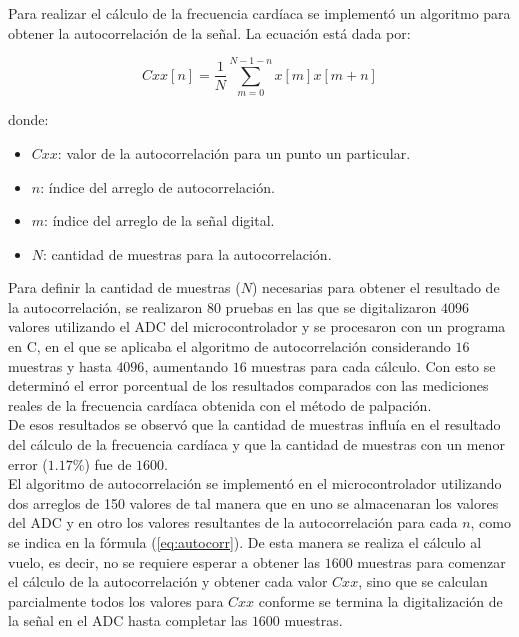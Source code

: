 \documentclass[journal]{IEEEtran}
\begin{document}
Para realizar el cálculo de la frecuencia cardíaca se implementó un algoritmo para obtener la autocorrelación de la señal. La ecuación está dada por:

\begin{equation}
	\label{eq:autocorr}
	Cxx[n] = \frac{1}{N} \sum_{m=0}^{N-1-n}x[m]x[m+n]
\end{equation}

donde: 
\begin{itemize}
	\item $Cxx$: valor de la autocorrelación para un punto un particular.
	\item $n$: índice del arreglo de autocorrelación.
	\item $m$: índice del arreglo de la señal digital.
	\item $N$: cantidad de muestras para la autocorrelación.\\
\end{itemize}

Para definir la cantidad de muestras ($N$) necesarias para obtener el resultado de la autocorrelación, se realizaron 80 pruebas en las que se digitalizaron $4096$ valores utilizando el ADC del microcontrolador y se procesaron con un programa en C, en el que se aplicaba el algoritmo de autocorrelación considerando $16$ muestras y hasta $4096$, aumentando $16$ muestras para cada cálculo. Con esto se determinó el error porcentual de los resultados comparados con las mediciones reales de la frecuencia cardíaca obtenida con el método de palpación. \\

De esos resultados se observó que la cantidad de muestras influía en el resultado del cálculo de la frecuencia cardíaca y que la cantidad de muestras con un menor error ($1.17\%$) fue de $1600$. \\

El algoritmo de autocorrelación se implementó en el microcontrolador utilizando dos arreglos de 150 valores de tal manera que en uno se almacenaran los valores del ADC y en otro los valores resultantes de la autocorrelación para cada $n$, como se indica en la fórmula (\ref{eq:autocorr}). De esta manera se realiza el cálculo al vuelo, es decir, no se requiere esperar a obtener las $1600$ muestras para comenzar el cálculo de la autocorrelación y obtener cada valor $Cxx$, sino que se calculan parcialmente todos los valores para $Cxx$ conforme se termina la digitalización de la señal en el ADC hasta completar las $1600$ muestras. \\
\end{document}
